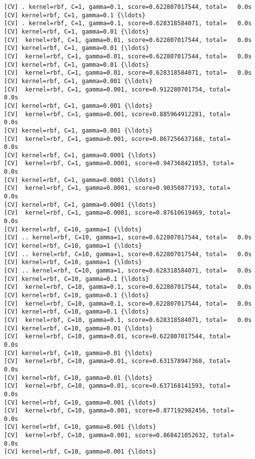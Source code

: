 \documentclass[11pt]{article}
\begin{document}
    \begin{Verbatim}[commandchars=\\\{\}]
[CV] . kernel=rbf, C=1, gamma=0.1, score=0.622807017544, total=   0.0s
[CV] kernel=rbf, C=1, gamma=0.1 {\ldots}
[CV] . kernel=rbf, C=1, gamma=0.1, score=0.628318584071, total=   0.0s
[CV] kernel=rbf, C=1, gamma=0.01 {\ldots}
[CV]  kernel=rbf, C=1, gamma=0.01, score=0.622807017544, total=   0.0s
[CV] kernel=rbf, C=1, gamma=0.01 {\ldots}
[CV]  kernel=rbf, C=1, gamma=0.01, score=0.622807017544, total=   0.0s
[CV] kernel=rbf, C=1, gamma=0.01 {\ldots}
[CV]  kernel=rbf, C=1, gamma=0.01, score=0.628318584071, total=   0.0s
[CV] kernel=rbf, C=1, gamma=0.001 {\ldots}
[CV]  kernel=rbf, C=1, gamma=0.001, score=0.912280701754, total=   0.0s
[CV] kernel=rbf, C=1, gamma=0.001 {\ldots}
[CV]  kernel=rbf, C=1, gamma=0.001, score=0.885964912281, total=   0.0s
[CV] kernel=rbf, C=1, gamma=0.001 {\ldots}
[CV]  kernel=rbf, C=1, gamma=0.001, score=0.867256637168, total=   0.0s
[CV] kernel=rbf, C=1, gamma=0.0001 {\ldots}
[CV]  kernel=rbf, C=1, gamma=0.0001, score=0.947368421053, total=   0.0s
[CV] kernel=rbf, C=1, gamma=0.0001 {\ldots}
[CV]  kernel=rbf, C=1, gamma=0.0001, score=0.90350877193, total=   0.0s
[CV] kernel=rbf, C=1, gamma=0.0001 {\ldots}
[CV]  kernel=rbf, C=1, gamma=0.0001, score=0.87610619469, total=   0.0s
[CV] kernel=rbf, C=10, gamma=1 {\ldots}
[CV] .. kernel=rbf, C=10, gamma=1, score=0.622807017544, total=   0.0s
[CV] kernel=rbf, C=10, gamma=1 {\ldots}
[CV] .. kernel=rbf, C=10, gamma=1, score=0.622807017544, total=   0.0s
[CV] kernel=rbf, C=10, gamma=1 {\ldots}
[CV] .. kernel=rbf, C=10, gamma=1, score=0.628318584071, total=   0.0s
[CV] kernel=rbf, C=10, gamma=0.1 {\ldots}
[CV]  kernel=rbf, C=10, gamma=0.1, score=0.622807017544, total=   0.0s
[CV] kernel=rbf, C=10, gamma=0.1 {\ldots}
[CV]  kernel=rbf, C=10, gamma=0.1, score=0.622807017544, total=   0.0s
[CV] kernel=rbf, C=10, gamma=0.1 {\ldots}
[CV]  kernel=rbf, C=10, gamma=0.1, score=0.628318584071, total=   0.0s
[CV] kernel=rbf, C=10, gamma=0.01 {\ldots}
[CV]  kernel=rbf, C=10, gamma=0.01, score=0.622807017544, total=   0.0s
[CV] kernel=rbf, C=10, gamma=0.01 {\ldots}
[CV]  kernel=rbf, C=10, gamma=0.01, score=0.631578947368, total=   0.0s
[CV] kernel=rbf, C=10, gamma=0.01 {\ldots}
[CV]  kernel=rbf, C=10, gamma=0.01, score=0.637168141593, total=   0.0s
[CV] kernel=rbf, C=10, gamma=0.001 {\ldots}
[CV]  kernel=rbf, C=10, gamma=0.001, score=0.877192982456, total=   0.0s
[CV] kernel=rbf, C=10, gamma=0.001 {\ldots}
[CV]  kernel=rbf, C=10, gamma=0.001, score=0.868421052632, total=   0.0s
[CV] kernel=rbf, C=10, gamma=0.001 {\ldots}

\end{Verbatim}
\end{document}
